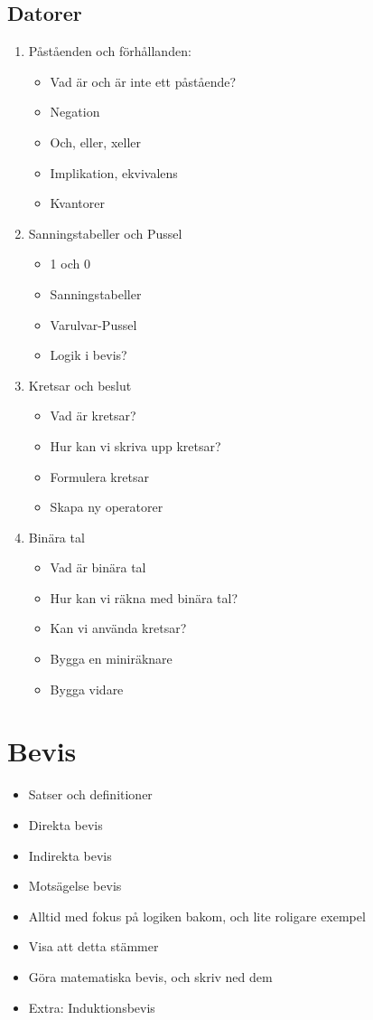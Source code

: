 \subsection{Datorer}
\begin{enumerate}
	\item Påståenden och förhållanden:
		\begin{itemize}
			\item Vad är och är inte ett påstående?
			\item Negation
			\item Och, eller, xeller
			\item Implikation, ekvivalens
			\item Kvantorer
		\end{itemize}
	\item Sanningstabeller och Pussel
		\begin{itemize}
			\item 1 och 0
			\item Sanningstabeller
			\item Varulvar-Pussel
			\item Logik i bevis?
		\end{itemize}
	\item Kretsar och beslut
		\begin{itemize}
			\item Vad är kretsar?
			\item Hur kan vi skriva upp kretsar?
			\item Formulera kretsar
			\item Skapa ny operatorer
		\end{itemize}
	\item Binära tal
		\begin{itemize}
			\item Vad är binära tal
			\item Hur kan vi räkna med binära tal?
			\item Kan vi använda kretsar?
			\item Bygga en miniräknare
			\item Bygga vidare
		\end{itemize}
\end{enumerate}


\section{Bevis}
\begin{itemize}
	\item Satser och definitioner
	\item Direkta bevis
	\item Indirekta bevis
	\item Motsägelse bevis
	\item Alltid med fokus på logiken bakom, och lite roligare exempel
	\item Visa att detta stämmer
	\item Göra matematiska bevis, och skriv ned dem
	\item Extra: Induktionsbevis
\end{itemize}
